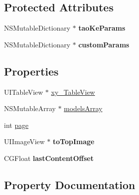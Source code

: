 \subsection*{Protected Attributes}
\begin{DoxyCompactItemize}
\item 
\mbox{\label{category_friends_view_controller_07_08_a155f6a8c0de83490ebc7b29c6726a48e}} 
N\+S\+Mutable\+Dictionary $\ast$ {\bfseries tao\+Ke\+Params}
\item 
\mbox{\label{category_friends_view_controller_07_08_a709d5a753e16709a962e0ed650dd0571}} 
N\+S\+Mutable\+Dictionary $\ast$ {\bfseries custom\+Params}
\end{DoxyCompactItemize}
\subsection*{Properties}
\begin{DoxyCompactItemize}
\item 
U\+I\+Table\+View $\ast$ \mbox{\hyperlink{category_friends_view_controller_07_08_ae4f63720f562081a11fd2e8b8f1b89db}{xy\+\_\+\+Table\+View}}
\item 
N\+S\+Mutable\+Array $\ast$ \mbox{\hyperlink{category_friends_view_controller_07_08_a8804b9dbc2a987cffa757e2492061304}{models\+Array}}
\item 
int \mbox{\hyperlink{category_friends_view_controller_07_08_a75db0b313a482b73bb91de61d43282cd}{page}}
\item 
\mbox{\label{category_friends_view_controller_07_08_aa540abbc1c9a7d5faf440e783a012e0c}} 
U\+I\+Image\+View $\ast$ {\bfseries to\+Top\+Image}
\item 
\mbox{\label{category_friends_view_controller_07_08_ad282fa67d9369186b098565eb2f3e453}} 
C\+G\+Float {\bfseries last\+Content\+Offset}
\end{DoxyCompactItemize}


\subsection{Property Documentation}
\mbox{\label{category_friends_view_controller_07_08_a8804b9dbc2a987cffa757e2492061304}} 
